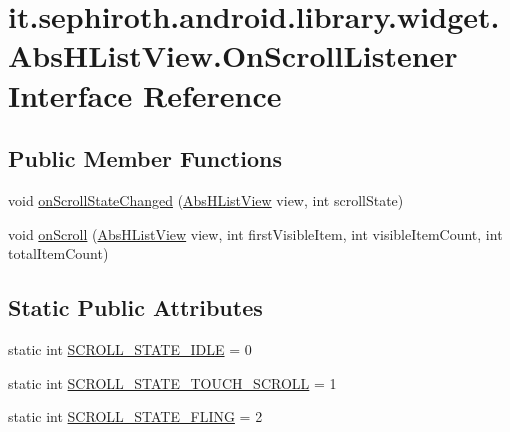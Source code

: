 \hypertarget{interfaceit_1_1sephiroth_1_1android_1_1library_1_1widget_1_1_abs_h_list_view_1_1_on_scroll_listener}{}\section{it.\+sephiroth.\+android.\+library.\+widget.\+Abs\+H\+List\+View.\+On\+Scroll\+Listener Interface Reference}
\label{interfaceit_1_1sephiroth_1_1android_1_1library_1_1widget_1_1_abs_h_list_view_1_1_on_scroll_listener}
\subsection*{Public Member Functions}
\begin{DoxyCompactItemize}
\item 
void \hyperlink{interfaceit_1_1sephiroth_1_1android_1_1library_1_1widget_1_1_abs_h_list_view_1_1_on_scroll_listener_a58710cada74ee13d7e5c57e2b6ea0db8}{on\+Scroll\+State\+Changed} (\hyperlink{classit_1_1sephiroth_1_1android_1_1library_1_1widget_1_1_abs_h_list_view}{Abs\+H\+List\+View} view, int scroll\+State)
\item 
void \hyperlink{interfaceit_1_1sephiroth_1_1android_1_1library_1_1widget_1_1_abs_h_list_view_1_1_on_scroll_listener_a723da32580a9e0e6f98f7c2826850ee5}{on\+Scroll} (\hyperlink{classit_1_1sephiroth_1_1android_1_1library_1_1widget_1_1_abs_h_list_view}{Abs\+H\+List\+View} view, int first\+Visible\+Item, int visible\+Item\+Count, int total\+Item\+Count)
\end{DoxyCompactItemize}
\subsection*{Static Public Attributes}
\begin{DoxyCompactItemize}
\item 
static int \hyperlink{interfaceit_1_1sephiroth_1_1android_1_1library_1_1widget_1_1_abs_h_list_view_1_1_on_scroll_listener_a7e8ebaabff9997917f64a44fb32df9c1}{S\+C\+R\+O\+L\+L\+\_\+\+S\+T\+A\+T\+E\+\_\+\+I\+D\+LE} = 0
\item 
static int \hyperlink{interfaceit_1_1sephiroth_1_1android_1_1library_1_1widget_1_1_abs_h_list_view_1_1_on_scroll_listener_ac223314e9f1d1cd748c8478fca711a12}{S\+C\+R\+O\+L\+L\+\_\+\+S\+T\+A\+T\+E\+\_\+\+T\+O\+U\+C\+H\+\_\+\+S\+C\+R\+O\+LL} = 1
\item 
static int \hyperlink{interfaceit_1_1sephiroth_1_1android_1_1library_1_1widget_1_1_abs_h_list_view_1_1_on_scroll_listener_a2807bd29ac4279868ad19ba76b343bb0}{S\+C\+R\+O\+L\+L\+\_\+\+S\+T\+A\+T\+E\+\_\+\+F\+L\+I\+NG} = 2
\end{DoxyCompactItemize}


